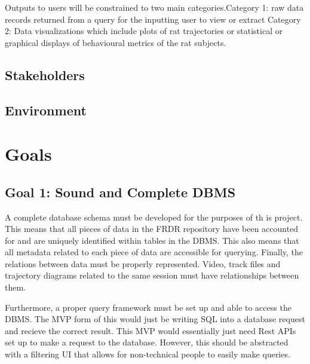 \documentclass{article}
\begin{document}
\par{Outputs to users will be constrained to two main categories.\newline \newline \indent Category 1: raw data records returned from a query for the inputting user to view or extract
\newline \newline \indent Category 2: Data visualizations which include plots of rat trajectories or statistical or graphical displays of behavioural metrics of the rat subjects.}

\subsection{Stakeholders}

\subsection{Environment}


\section{Goals}

  \subsection{Goal 1: Sound and Complete DBMS} 
  
  \par{ A complete database schema must be developed for the purposes
  of th is project. This means that all pieces of data in the FRDR repository have
  been accounted for and are uniquely identified within tables in the DBMS. This also means that
  all metadata related to each piece of data are accessible for querying. Finally,
  the relations between data must be properly represented. Video, track files and trajectory diagrams
  related to the same session must have relationships between them.
  
  Furthermore, a proper query framework must be set up and able to access the DBMS. 
  The MVP form of this would just be writing SQL into a database request and
  recieve the correct result. This MVP would essentially just need Rest APIs set up
  to make a request to the database. However, this should be abstracted with a filtering UI that
  allows for non-technical people to easily make queries.}
\end{document}
